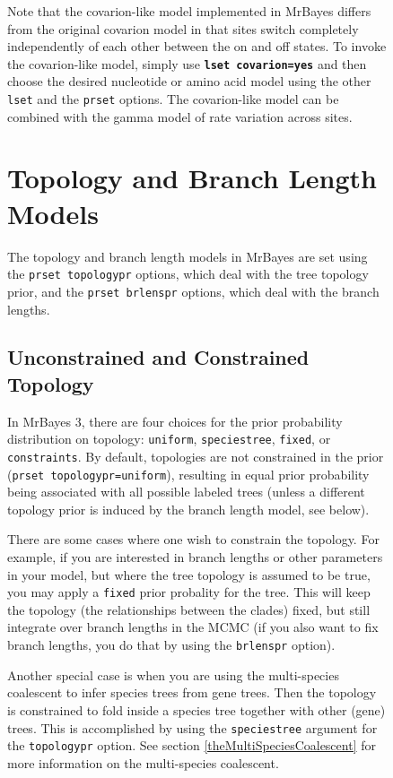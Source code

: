 \documentclass[12pt]{book}
\newcommand{\ttt}[1]{\texttt{#1}}
\newcommand{\tb}[1]{\ttt{\textbf{#1}}}
\begin{document}
\begin{figure}[h]
Note that the covarion-like model implemented in MrBayes differs from the original covarion model
in that sites switch completely independently of each other between the on and off states. To
invoke the covarion-like model, simply use \tb{lset covarion=yes} and then choose the desired
nucleotide or amino acid model using the other \ttt{lset} and the \ttt{prset} options. The
covarion-like model can be combined with the gamma model of rate variation across sites.


\section{Topology and Branch Length Models}

The topology and branch length models in MrBayes are set using the \ttt{prset topologypr} options,
which deal with the tree topology prior, and the \ttt{prset brlenspr} options, which deal with the
branch lengths.

\subsection{Unconstrained and Constrained Topology}
\label{unconstrainedAndConstrainedTopology}

In MrBayes 3, there are four choices for the prior probability distribution on topology:
\ttt{uniform}, \ttt{speciestree}, \ttt{fixed}, or \ttt{constraints}. By default, topologies are not
constrained in the prior (\ttt{prset topologypr=uniform}), resulting in equal prior probability
being associated with all possible labeled trees (unless a different topology prior is induced by
the branch length model, see below).

There are some cases where one wish to constrain the topology. For example, if you are interested
in branch lengths or other parameters in your model, but where the tree topology is assumed to be
true, you may apply a \ttt{fixed} prior probality for the tree. This will keep the topology (the
relationships between the clades) fixed, but still integrate over branch lengths in the MCMC (if
you also want to fix branch lengths, you do that by using the \ttt{brlenspr} option).

Another special case is when you are using the multi-species coalescent to infer species trees from
gene trees. Then the topology is constrained to fold inside a species tree together with other
(gene) trees. This is accomplished by using the \ttt{speciestree} argument for the \ttt{topologypr}
option. See section \ref{theMultiSpeciesCoalescent} for more information on the multi-species
coalescent.


\end{figure}
\end{document}
